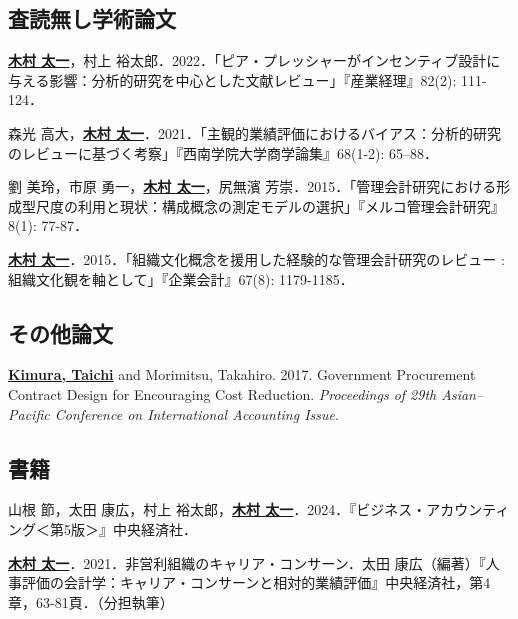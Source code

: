\documentclass[letterpaper,11pt]{article}
\renewenvironment{itemize}{
  \begin{list}{}{
    \setlength{\leftmargin}{1.5em}
  }
}{
  \end{list}
}
\begin{document}
\subsection*{査読無し学術論文}

\begin{itemize}
    \item \underline{\textbf{木村 太一}}，村上 裕太郎．2022．「ピア・プレッシャーがインセンティブ設計に与える影響：分析的研究を中心とした文献レビュー」『産業経理』82(2): 111-124．

    \item 森光 高大，\underline{\textbf{木村 太一}}．2021．「主観的業績評価におけるバイアス：分析的研究のレビューに基づく考察」『西南学院大学商学論集』68(1-2): 65--88．

	\item 劉 美玲，市原 勇一，\underline{\textbf{木村 太一}}，尻無濱 芳崇．2015．「管理会計研究における形成型尺度の利用と現状：構成概念の測定モデルの選択」『メルコ管理会計研究』8(1): 77-87．

	\item \underline{\textbf{木村 太一}}．2015．「組織文化概念を援用した経験的な管理会計研究のレビュー : 組織文化観を軸として」『企業会計』67(8): 1179-1185．
\end{itemize}

\subsection*{その他論文}

\begin{itemize}
    \item \underline{\textbf{Kimura, Taichi}} and Morimitsu, Takahiro. 2017. Government Procurement Contract Design for Encouraging Cost Reduction. \textit{Proceedings of 29th Asian--Pacific Conference on International Accounting Issue}.
\end{itemize}

\subsection*{書籍}

\begin{itemize}
    \item 山根 節，太田 康広，村上 裕太郎，\underline{\textbf{木村 太一}}．2024．『ビジネス・アカウンティング＜第5版＞』中央経済社．
	\item \underline{\textbf{木村 太一}}．2021．非営利組織のキャリア・コンサーン．太田 康広（編著）『人事評価の会計学：キャリア・コンサーンと相対的業績評価』中央経済社，第4章，63-81頁．（分担執筆）
\end{itemize}
\end{document}

